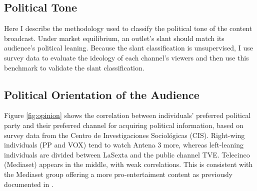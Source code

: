 \documentclass[12pt]{article}
\begin{document}
	
	\subsection{Political Tone}
	
	\label{sec:classification}
	
	Here I describe the methodology used to classify the political tone of the content broadcast. Under market equilibrium, an outlet's slant should match its audience's political leaning. Because the slant classification is unsupervised, I use survey data to evaluate the ideology of each channel's viewers and then use this benchmark to validate the slant classification.
	
	\subsection*{Political Orientation of the Audience}
	
	Figure \ref{fig:opinion} shows the correlation between individuals' preferred political party and their preferred channel for acquiring political information, based on survey data from the Centro de Investigaciones Sociológicas (CIS). Right-wing individuals (PP and VOX) tend to watch Antena 3 more, whereas left-leaning individuals are divided between LaSexta and the public channel TVE. Telecinco (Mediaset) appears in the middle, with weak correlations. This is consistent with the Mediaset group offering a more pro-entertaiment content as previously documented in \cite{durante_aer}.
	
\end{document}
